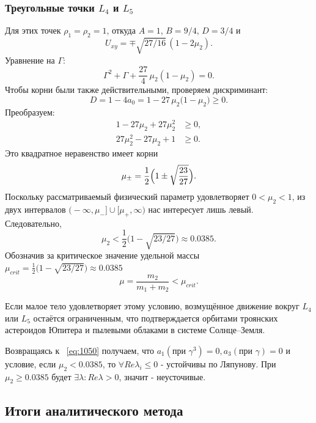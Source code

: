 \documentclass[12pt]{article}
\newcommand{\mutwo}{\mu_2}
\begin{document}
\subsubsection{Треугольные точки $L_4$ и $L_5$}
Для этих точек $\rho_1=\rho_2=1$, откуда $A=1$, $B=9/4$, $D=3/4$ и
\[U_{xy}=\mp\sqrt{27/16}\,(1-2\mutwo).\]
Уравнение на $\Gamma$:
\begin{equation}\tag{1116}
  \Gamma^{2}+\Gamma+\frac{27}{4}\,\mutwo(1-\mutwo)=0.
\end{equation}
Чтобы корни были также действительными, проверяем дискриминант:
\begin{equation}
D=1-4a_0=1-27\,\mu_2\bigl(1-\mu_2\bigr)\ge0.
\end{equation}
Преобразуем:
\begin{align}
1-27\mu_2+27\mu_2^2&\ge0,\\[2pt]
27\mu_2^2-27\mu_2+1&\ge0.
\end{align}
Это квадратное неравенство имеет корни
\[\mu_{\pm}=\frac12\Bigl(1\pm\sqrt{\frac{23}{27}}\Bigr).
\]
Поскольку рассматриваемый физический параметр удовлетворяет \(0<\mu_2<1\),
из двух интервалов
\(\bigl(-\infty,\mu_-\bigr]\cup\bigl[\mu_+,\infty\bigr)\)
нас интересует лишь левый.  Следовательно,
\begin{equation}\tag{1117}
  \mutwo<\frac12\bigl(1-\sqrt{23/27}\bigr)\approx0.0385.
\end{equation}
Обозначив за критическое значение удельной массы $\mu_{crit} = \frac12\bigl(1-\sqrt{23/27}\bigr)\approx0.0385$
\begin{equation}\tag{1118}
  \mu = \frac{m_2}{m_1+m_2}< \mu_{crit}.
\end{equation}

Если малое тело удовлетворяет этому условию, возмущённое движение вокруг $L_4$ или $L_5$ остаётся ограниченным, что подтверждается орбитами троянских астероидов Юпитера и пылевыми облаками в системе Солнце–Земля.

Возвращаясь к ~\eqref{eq:1050} получаем, что $a_1(\text{при }\gamma^3) = 0, a_3(\text{при }\gamma) = 0$ и условие, если $\mutwo < 0.0385$, то $\forall Re\lambda_i \leqslant 0$ - устойчивы по Ляпунову. При $\mutwo \geqslant 0.0385$ будет $\exists\lambda: Re\lambda > 0$, значит - неусточивые.

\bigskip

\subsection{Итоги аналитического метода}
\end{document}
